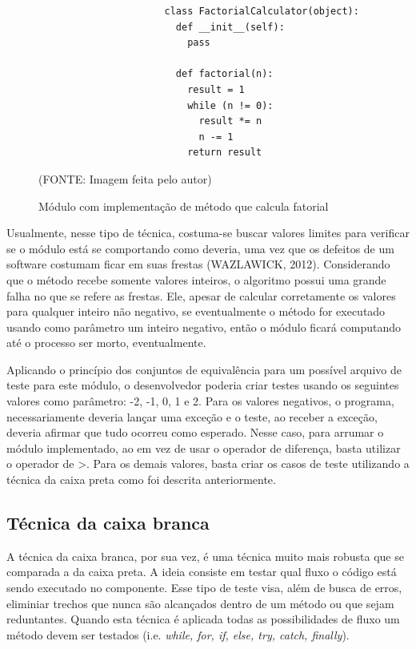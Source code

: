 \documentclass[
    12pt,       %
    openright,      %
    twoside,      %
    a4paper,      %
    english,      %
    french,       %
    spanish,      %
    brazil,       %
    ]{abntex2}
\begin{document}
              \begin{figure}[!htbp]
                  \begin{lstlisting}
                      class FactorialCalculator(object):
                        def __init__(self):
                          pass

                        def factorial(n):
                          result = 1
                          while (n != 0):
                            result *= n
                            n -= 1
                          return result

                  \end{lstlisting}
                  \caption{\label{fig:passaro}Módulo com implementação de método que calcula fatorial}
                  \begin{center}(FONTE: Imagem feita pelo autor)\end{center}
              \end{figure}

              Usualmente, nesse tipo de técnica, costuma-se buscar valores limites para verificar
              se o módulo está se comportando como deveria, uma vez que os defeitos de um software
              costumam ficar em suas frestas (WAZLAWICK, 2012). Considerando que o método recebe somente
              valores inteiros, o algoritmo possui uma grande falha no que se refere as frestas. Ele,
              apesar de calcular corretamente os valores para qualquer inteiro não negativo, se
              eventualmente o método for executado usando como parâmetro um inteiro negativo, então o
              módulo ficará computando até o processo ser morto, eventualmente.

              Aplicando o princípio dos conjuntos de equivalência para um possível arquivo de teste
              para este módulo, o desenvolvedor poderia criar testes usando os seguintes valores como
          parâmetro: -2, -1, 0, 1 e 2. Para os valores negativos, o programa, necessariamente deveria
              lançar uma exceção e o teste, ao receber a exceção, deveria afirmar que tudo ocorreu como
              esperado. Nesse caso, para arrumar o módulo implementado, ao em vez de usar o
              operador de diferença, basta utilizar o operador de >. Para os demais valores, basta criar
              os casos de teste utilizando a técnica da caixa preta como foi descrita anteriormente.

          \subsection{Técnica da caixa branca}
              A técnica da caixa branca, por sua vez, é uma técnica muito mais robusta que se comparada
              a da caixa preta. A ideia consiste em testar qual fluxo o código está sendo executado no
              componente. Esse tipo de teste visa, além de busca de erros, eliminiar trechos que nunca
               são alcançados dentro de um método ou que sejam reduntantes. Quando esta técnica é
               aplicada todas as possibilidades de fluxo um método devem ser testados
               (i.e. \textit{while, for, if, else, try, catch, finally}).
\end{document}
